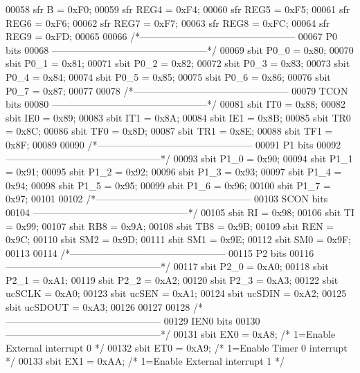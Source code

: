 \begin{DoxyCode}
00058 sfr B     = 0xF0; 
00059 sfr REG4    = 0xF4; 
00060 sfr REG5    = 0xF5; 
00061 sfr REG6    = 0xF6; 
00062 sfr REG7    = 0xF7; 
00063 sfr REG8    = 0xFC; 
00064 sfr REG9    = 0xFD; 
00065 
00066 \textcolor{comment}{/*------------------------------------------------}
00067 \textcolor{comment}{P0 bits }
00068 \textcolor{comment}{------------------------------------------------*/}
00069 sbit P0_0 = 0x80;
00070 sbit P0_1 = 0x81;
00071 sbit P0_2 = 0x82;
00072 sbit P0_3 = 0x83;
00073 sbit P0_4 = 0x84;
00074 sbit P0_5 = 0x85;
00075 sbit P0_6 = 0x86;
00076 sbit P0_7 = 0x87;
00077 
00078 \textcolor{comment}{/*------------------------------------------------}
00079 \textcolor{comment}{TCON bits}
00080 \textcolor{comment}{------------------------------------------------*/}
00081 sbit IT0  = 0x88;
00082 sbit IE0  = 0x89;
00083 sbit IT1  = 0x8A;
00084 sbit IE1  = 0x8B;
00085 sbit TR0  = 0x8C;
00086 sbit TF0  = 0x8D;
00087 sbit TR1  = 0x8E;
00088 sbit TF1  = 0x8F;
00089 
00090 \textcolor{comment}{/*------------------------------------------------}
00091 \textcolor{comment}{P1 bits}
00092 \textcolor{comment}{------------------------------------------------*/}
00093 sbit P1_0 = 0x90;
00094 sbit P1_1 = 0x91;
00095 sbit P1_2 = 0x92;
00096 sbit P1_3 = 0x93;
00097 sbit P1_4 = 0x94;
00098 sbit P1_5 = 0x95;
00099 sbit P1_6 = 0x96;
00100 sbit P1_7 = 0x97;
00101 
00102 \textcolor{comment}{/*------------------------------------------------}
00103 \textcolor{comment}{SCON bits}
00104 \textcolor{comment}{------------------------------------------------*/}
00105 sbit RI   = 0x98;
00106 sbit TI   = 0x99;
00107 sbit RB8  = 0x9A;
00108 sbit TB8  = 0x9B;
00109 sbit REN  = 0x9C;
00110 sbit SM2  = 0x9D;
00111 sbit SM1  = 0x9E;
00112 sbit SM0  = 0x9F;
00113 
00114 \textcolor{comment}{/*------------------------------------------------}
00115 \textcolor{comment}{P2 bits}
00116 \textcolor{comment}{------------------------------------------------*/}
00117 sbit P2_0 = 0xA0;
00118 sbit P2_1 = 0xA1;
00119 sbit P2_2 = 0xA2;
00120 sbit P2_3 = 0xA3;
00122 sbit ucSCLK = 0xA0;
00123 sbit ucSEN = 0xA1;
00124 sbit ucSDIN = 0xA2;
00125 sbit ucSDOUT = 0xA3;
00126 
00127 
00128 \textcolor{comment}{/*------------------------------------------------}
00129 \textcolor{comment}{IEN0 bits}
00130 \textcolor{comment}{------------------------------------------------*/}
00131 sbit EX0  = 0xA8;       \textcolor{comment}{/* 1=Enable External interrupt 0 */}
00132 sbit ET0  = 0xA9;       \textcolor{comment}{/* 1=Enable Timer 0 interrupt */}
00133 sbit EX1  = 0xAA;       \textcolor{comment}{/* 1=Enable External interrupt 1 */}

\end{DoxyCode}

